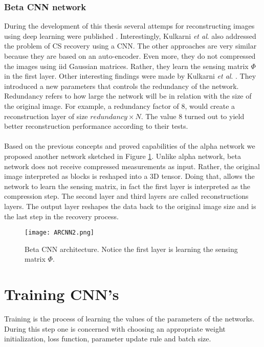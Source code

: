 \FloatBarrier

\subsubsection{Beta CNN network} \label{ch:betaNet}
During the development of this thesis several attemps for reconstructing images using deep learning were published \cite{kulkarni2016reconnet,mousavi2015deep,iliadis2016deep,iliadis2016deepbinarymask,adler2016deep}. Interestingly, Kulkarni \textit{et al}. \cite{kulkarni2016reconnet} also addressed the problem of CS recovery using a CNN. The other approaches are very similar because they are based on an auto-encoder.  Even more, they do not compressed the images using iid Gaussian matrices. Rather, they learn the sensing matrix $\Phi$ in the first layer. Other interesting findings were made by Kulkarni \textit{et al}. \cite{kulkarni2016reconnet}. They introduced a new parameters that controls the redundancy of the network. Redundancy refers to how large the network will be in relation with the size of the original image. For example, a redundancy factor of 8, would create a reconstruction layer of size $redundancy \times N$. The value 8 turned out to yield better reconstruction performance according to their tests.\\\\
Based on the previous concepts and proved capabilities of the alpha network we proposed another network sketched in Figure \ref{fig:ARCNNim2}. Unlike alpha network, beta network does not receive compressed measurements as input. Rather, the original image interpreted as blocks is reshaped into a 3D tensor. Doing that, allows the network to learn the sensing matrix, in fact the first layer is interpreted as the compression step. The second layer and third layers are called reconstructions layers. The output layer reshapes the data back to the original image size and is the last step in the recovery process.         
\begin{figure}[!htb]
\centering 
\texttt{[image: ARCNN2.png]} 
\caption[Beta CNN architecture for recovery ]{Beta CNN architecture. Notice the first layer is learning the sensing matrix $\Phi$.}
\label{fig:ARCNNim2} 
\end{figure}

\FloatBarrier

\section{Training CNN's}
Training is the process of learning the values of the parameters of the networks. During this step one is concerned with choosing an appropriate weight initialization, loss function, parameter update rule and batch size.

